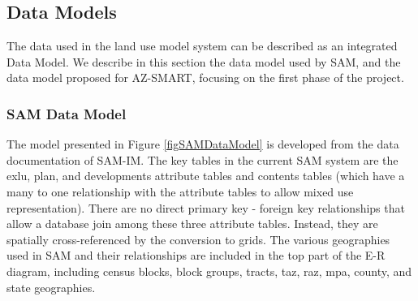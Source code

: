 \subsection{Data Models}
The data used in the land use model system can be described as an
integrated Data Model.   We describe in this section the data model 
used by SAM, and the data model proposed for AZ-SMART, focusing on
the first phase of the project.

\subsubsection{SAM Data Model}

The model presented in Figure \ref{figSAMDataModel} is developed from the
data documentation of SAM-IM.  The key tables in the current SAM system are the 
exlu, plan, and developments attribute tables and contents tables (which have 
a many to one relationship with the attribute tables to allow mixed use
representation).  There are no direct primary key - foreign key relationships that 
allow a database join among these three attribute tables.  Instead, they are spatially 
cross-referenced by the conversion to grids.  The various geographies used in SAM 
and their relationships are included in the top part of the E-R diagram, including 
census blocks, block groups, tracts, taz, raz, mpa, county, and state geographies.

